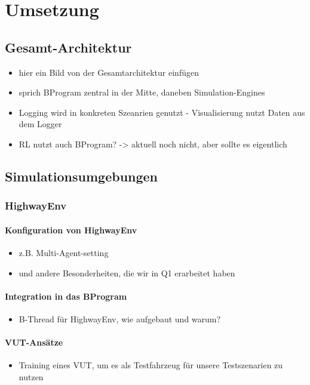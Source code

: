 \chapter{Umsetzung}

\section{Gesamt-Architektur}
\begin{itemize}
    \item hier ein Bild von der Gesamtarchitektur einfügen
    \item sprich BProgram zentral in der Mitte, daneben Simulation-Engines
    \item Logging wird in konkreten Szeanrien genutzt - Visualisierung nutzt Daten aus dem Logger
    \item RL nutzt auch BProgram? -> aktuell noch nicht, aber sollte es eigentlich
\end{itemize}
\section{Simulationsumgebungen}
\subsection{HighwayEnv}
\subsubsection{Konfiguration von HighwayEnv}
\begin{itemize}
    \item z.B. Multi-Agent-setting
    \item und andere Besonderheiten, die wir in Q1 erarbeitet haben
\end{itemize}
\subsubsection{Integration in das BProgram}
\begin{itemize}
    \item B-Thread für HighwayEnv, wie aufgebaut und warum?
\end{itemize}
\subsubsection{VUT-Ansätze}
\begin{itemize}
    \item Training eines VUT, um es als Testfahrzeug für unsere Testszenarien zu nutzen
\end{itemize}
